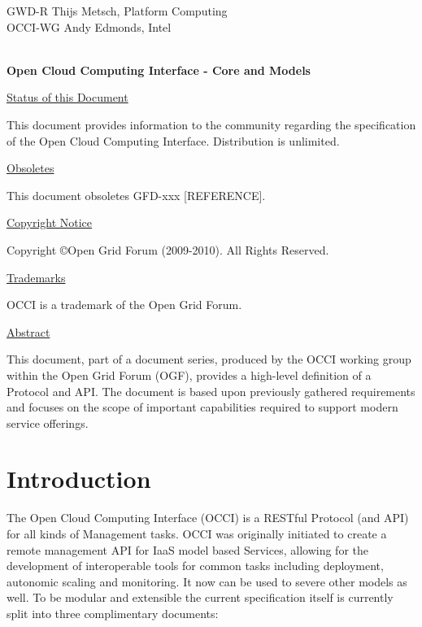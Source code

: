 \documentclass[10pt,a4paper]{article}
\begin{document}
\thispagestyle{empty}

GWD-R \hfill  Thijs Metsch, Platform Computing\\
OCCI-WG \hfill  Andy Edmonds, Intel\\
\\

\vspace*{0.5in}

\begin{Large}
\textbf{Open Cloud Computing Interface - Core and Models}
\end{Large}

\vspace*{0.5in}

\underline{Status of this Document}

This document provides information to the community regarding the
specification of the Open Cloud Computing Interface. Distribution is
unlimited.

\underline{Obsoletes}

This document obsoletes GFD-xxx [REFERENCE].

\underline{Copyright Notice}

Copyright \copyright Open Grid Forum (2009-2010). All Rights Reserved.

\underline{Trademarks}

OCCI is a trademark of the Open Grid Forum.

\underline{Abstract}

This document, part of a document series, produced by the OCCI working
group within the Open Grid Forum (OGF), provides a high-level
definition of a Protocol and API. The document is based upon
previously gathered requirements and focuses on the scope of important
capabilities required to support modern service offerings.

\newpage
\tableofcontents
\newpage

\section{Introduction}
The Open Cloud Computing Interface (OCCI) is a RESTful Protocol (and
API)  for all kinds of
Management tasks. OCCI was originally initiated to create a remote
management API for IaaS model based Services, allowing for the
development of interoperable tools for common tasks including
deployment, autonomic scaling and monitoring. It now can be used to
severe other models as well. To be modular and extensible the current
specification itself is currently split into three complimentary
documents:
\end{document}
